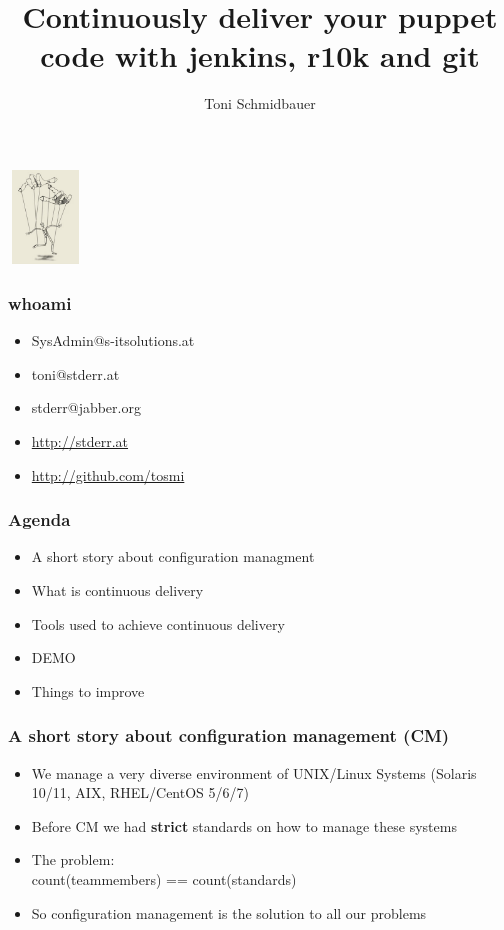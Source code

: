 \documentclass{beamer}
\title{Continuously deliver your puppet code with jenkins, r10k and git\\}
\author{Toni Schmidbauer}
\begin{document}
\begin{frame}
  \center\includegraphics[height=2.5cm,width=2cm]{../pics/puppet.png}
  \titlepage
\end{frame}

\begin{frame}
  \frametitle{whoami}
  \begin{itemize}
  \item SysAdmin@s-itsolutions.at
  \item toni@stderr.at
  \item stderr@jabber.org
  \item \url{http://stderr.at}
  \item \url{http://github.com/tosmi}
  \end{itemize}
\end{frame}
\begin{frame}

  \frametitle{Agenda}

  \begin{itemize}
  \item A short story about configuration managment
  \item What is continuous delivery
  \item Tools used to achieve continuous delivery
  \item DEMO
  \item Things to improve
  \end{itemize}

\end{frame}

\begin{frame}
  \frametitle{A short story about configuration management (CM)}

  \begin{itemize}
  \item<1-> We manage a very diverse environment of UNIX/Linux Systems (Solaris 10/11, AIX, RHEL/CentOS 5/6/7)
  \item<2-> Before CM we had \textbf{strict} standards on how to manage these systems
  \item<3-> The problem: \\count(teammembers) == count(standards)
  \item<4-> So configuration management is the solution to all our problems
  \end{itemize}

\end{frame}
\end{document}
